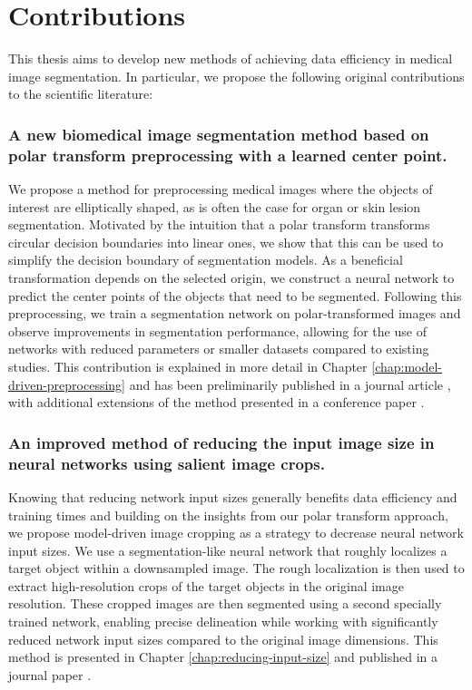 \section{Contributions}

This thesis aims to develop new methods of achieving data efficiency in medical image segmentation. In particular, we propose the following original contributions to the scientific literature:

\subsubsection{A new biomedical image segmentation method based on polar transform preprocessing with a learned center point.}

We propose a method for preprocessing medical images where the objects of interest are elliptically shaped, as is often the case for organ or skin lesion segmentation. Motivated by the intuition that a polar transform transforms circular decision boundaries into linear ones, we show that this can be used to simplify the decision boundary of segmentation models. As a beneficial transformation depends on the selected origin, we construct a neural network to predict the center points of the objects that need to be segmented. Following this preprocessing, we train a segmentation network on polar-transformed images and observe improvements in segmentation performance, allowing for the use of networks with reduced parameters or smaller datasets compared to existing studies. This contribution is explained in more detail in Chapter \ref{chap:model-driven-preprocessing} and has been preliminarily published in a journal article \cite{bencevicTrainingPolarImage2021}, with additional extensions of the method presented in a conference paper \cite{bencevicUsingPolarTransform2022}.

\subsubsection{An improved method of reducing the input image size in neural networks using salient image crops.}

Knowing that reducing network input sizes generally benefits data efficiency and training times and building on the insights from our polar transform approach, we propose model-driven image cropping as a strategy to decrease neural network input sizes. We use a segmentation-like neural network that roughly localizes a target object within a downsampled image. The rough localization is then used to extract high-resolution crops of the target objects in the original image resolution. These cropped images are then segmented using a second specially trained network, enabling precise delineation while working with significantly reduced network input sizes compared to the original image dimensions. This method is presented in Chapter \ref{chap:reducing-input-size} and published in a journal paper \cite{bencevicSegmentthenSegmentContextPreservingCropBased2023a}.

